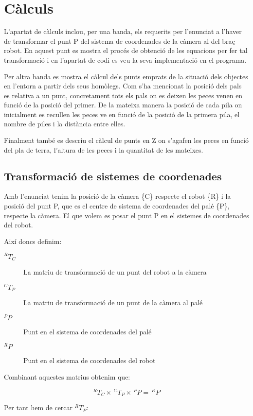 \section{Càlculs}
L'apartat de càlculs inclou, per una banda, els requerits per l'enunciat a
l'haver de transformar el punt P del sistema de coordenades de la càmera al del
braç robot. En aquest punt es mostra el procés de obtenció de les equacions per
fer tal transformació i en l'apartat de codi es veu la seva implementació en el
programa.

Per altra banda es mostra el càlcul dels punts emprats de la situació dels
objectes en l'entorn a partir dels seus homòlegs. Com s'ha mencionat la posició
dels pals es relativa a un punt, concretament tots els pals on es deixen les
peces venen en funció de la posició del primer.
De la mateixa manera la posició de cada pila on inicialment es recullen les
peces ve en funció de la posició de la primera pila, el nombre de piles i la
distància entre elles.

Finalment també es descriu el càlcul de punts en Z on s'agafen les peces en
funció del pla de terra, l'altura de les peces i la quantitat de les mateixes.

\subsection{Transformació de sistemes de coordenades}
Amb l'enunciat tenim la posició de la càmera \{C\} respecte el robot \{R\} i
la posició del punt P, que es el centre de sistema de coordenades del palé
\{P\}, respecte la càmera. El que volem es posar el punt P en el sistemes de
coordenades del robot.

Així doncs definim:

\begin{description}
\item[$^RT_C$] La matriu de transformació de un punt del robot a la càmera
\item[$^CT_P$] La matriu de transformació de un punt de la càmera al palé
\item[$^PP$] Punt en el sistema de coordenades del palé
\item[$^RP$] Punt en el sistema de coordenades del robot
\end{description}

Combinant aquestes matrius obtenim que:

$$ ^RT_C \times \,^CT_P \times \,^PP = \,^RP $$

Per tant hem de cercar $^RT_P$:


